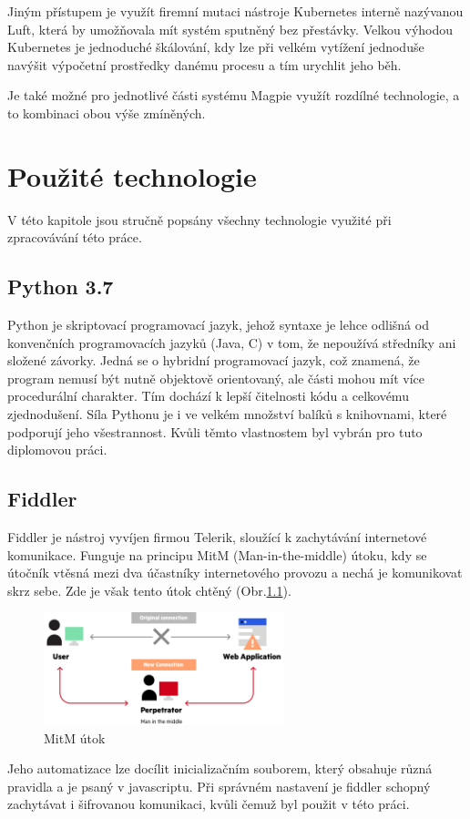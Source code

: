\documentclass[thesis=M,czech,hidelinks]{FITthesis}[2013/05/06]
\begin{document}
Jiným přístupem je využít firemní mutaci nástroje Kubernetes interně nazývanou Luft, která by umožňovala mít systém sputněný bez přestávky. Velkou výhodou Kubernetes je jednoduché škálování, kdy lze při velkém vytížení jednoduše navýšit výpočetní prostředky danému procesu a tím urychlit jeho běh.

Je také možné pro jednotlivé části systému Magpie využít rozdílné technologie, a to kombinaci obou výše zmíněných.






\chapter{Použité technologie}
V této kapitole jsou stručně popsány všechny technologie využité při zpracovávání této práce.
\section{Python 3.7}\label{sec:python}
Python je skriptovací programovací jazyk, jehož syntaxe je lehce odlišná od konvenčních programovacích jazyků (Java, C) v tom, že nepoužívá středníky ani složené závorky. Jedná se o hybridní programovací jazyk, což znamená, že program nemusí být nutně objektově orientovaný, ale části mohou mít více procedurální charakter. Tím dochází k lepší čitelnosti kódu a celkovému zjednodušení. Síla Pythonu je i ve velkém množství balíků s knihovnami, které podporují jeho všestrannost. Kvůli těmto vlastnostem byl vybrán pro tuto diplomovou práci.

\section{Fiddler}\label{sec:fiddler}
Fiddler je nástroj vyvíjen firmou Telerik, sloužící k zachytávání internetové komunikace. Funguje na principu MitM (Man-in-the-middle) útoku, kdy se útočník vtěsná mezi dva účastníky internetového provozu a nechá je komunikovat skrz sebe. Zde je však tento útok chtěný (Obr.\ref{fig:mitm}).
\begin{figure}[h]
	\centering
	\includegraphics[width=7cm]{pictures/mitm.png}
	\caption{MitM útok \cite{mitm}}
	\label{fig:mitm}
\end{figure}
Jeho automatizace lze docílit inicializačním souborem, který obsahuje různá pravidla a je psaný v javascriptu. Při správném nastavení je fiddler schopný zachytávat i šifrovanou komunikaci, kvůli čemuž byl použit v této práci.
\end{document}
